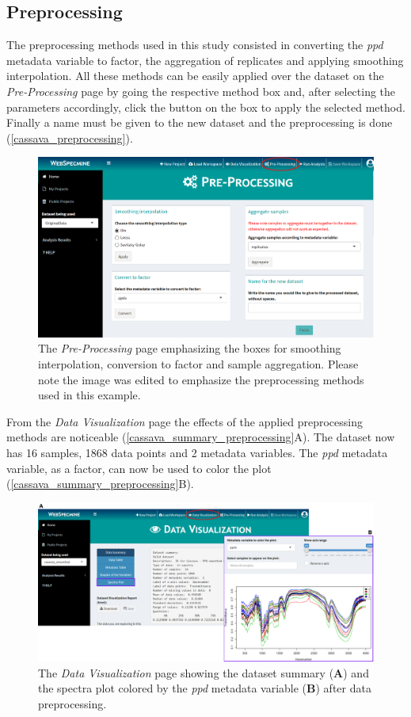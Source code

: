 \subsection{Preprocessing}

The preprocessing methods used in this study consisted in converting the \textit{ppd} metadata variable to factor, the aggregation of replicates and applying smoothing interpolation. All these methods can be easily applied over the dataset on the \textit{Pre-Processing} page by going the respective method box and, after selecting the parameters accordingly, click the button on the box to apply the selected method. Finally a name must be given to the new dataset and the preprocessing is done (\autoref{cassava_preprocessing}).

\begin{figure}[H]
	\centering
	\includegraphics[width=0.8\linewidth]{Imagens/CassavaPPD/preprocessing}
	\caption{The \textit{Pre-Processing} page emphasizing the boxes for smoothing interpolation, conversion to factor and sample aggregation. Please note the image was edited to emphasize the preprocessing methods used in this example.}
	\label{cassava_preprocessing}
\end{figure}


From the \textit{Data Visualization} page the effects of the applied preprocessing methods are noticeable (\autoref{cassava_summary_preprocessing}A). The dataset now has 16 samples, 1868 data points and 2 metadata variables. The \textit{ppd} metadata variable, as a factor, can now be used to color the plot (\autoref{cassava_summary_preprocessing}B).

\begin{figure}[H]
	\centering
	\includegraphics[width=1\linewidth]{Imagens/CassavaPPD/data_overview_preproc}
	\caption{The \textit{Data Visualization} page showing the dataset summary (\textbf{A}) and the spectra plot colored by the \textit{ppd} metadata variable (\textbf{B}) after data preprocessing.}
	\label{cassava_summary_preprocessing}
\end{figure}


